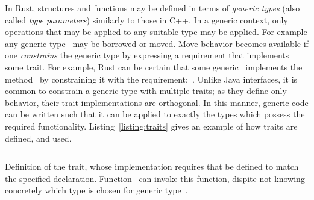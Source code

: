 In Rust, structures and functions may be defined in terms of \textit{generic types} (also called \textit{type parameters}) similarly to those in C++. In a generic context, only operations that may be applied to any suitable type may be applied. For example any generic type~ may be borrowed or moved. Move behavior becomes available if one \textit{constrains} the generic type by expressing a requirement that implements some trait. For example, Rust can be certain that some generic~ implements the method~ by constraining it with the requirement:~. Unlike Java interfaces, it is common to constrain a generic type with multiple traits; as they define only behavior, their trait implementations are orthogonal. In this manner, generic code can be written such that it can be applied to exactly the types which possess the required functionality. Listing~\ref{listing:traits} gives an example of how traits are defined, and used.


\begin{listing}[ht]
	\centering
	\inputminted[]{rust}{traits.rs}
	\caption[Generic type example in Rust.]{Definition of the  trait, whose implementation requires that  be defined to match the specified declaration. Function~ can invoke this function, dispite not knowing concretely which type is chosen for generic type~.}
	\label{listing:traits}
\end{listing}


